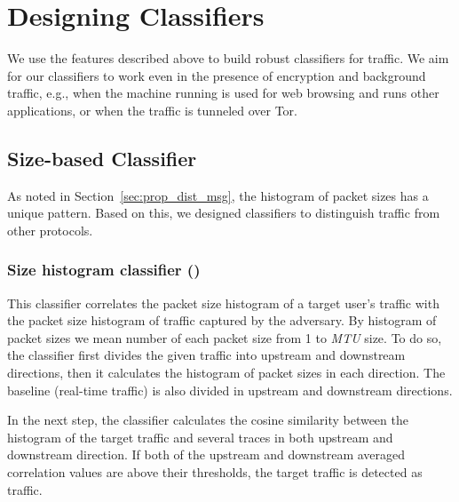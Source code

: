 \section{Designing \bc Classifiers}
We use the features described above to build robust classifiers for \bc traffic. 
We aim for our classifiers to work even in the presence of encryption and background traffic, e.g., 
when the machine running \bc is used for web browsing and runs other applications, or when the \bc traffic is tunneled over Tor. %

\subsection{Size-based Classifier}
As noted in Section~\ref{sec:prop_dist_msg}, the histogram of \bc packet sizes has a unique pattern. Based on this, we designed  classifiers to distinguish \bc traffic from other protocols. 

\subsubsection{Size histogram classifier ()}\label{sec:all-packet-size-classifier}

This classifier correlates the packet size histogram of a target user's traffic with the packet size histogram of \bc traffic captured by the adversary. By histogram of packet sizes we mean number of each packet size from 1 to \textit{MTU} size. To do so, the classifier first divides the given traffic into upstream and downstream directions, then it calculates the histogram of packet sizes in each direction. The baseline (real-time \bc traffic) is also divided in upstream and downstream directions. 

In the next step, the classifier calculates the cosine similarity between the histogram of the target traffic and several \bc traces in both upstream and downstream direction. If both of the upstream and downstream averaged correlation values are above their thresholds, the target traffic is detected as \bc traffic.



